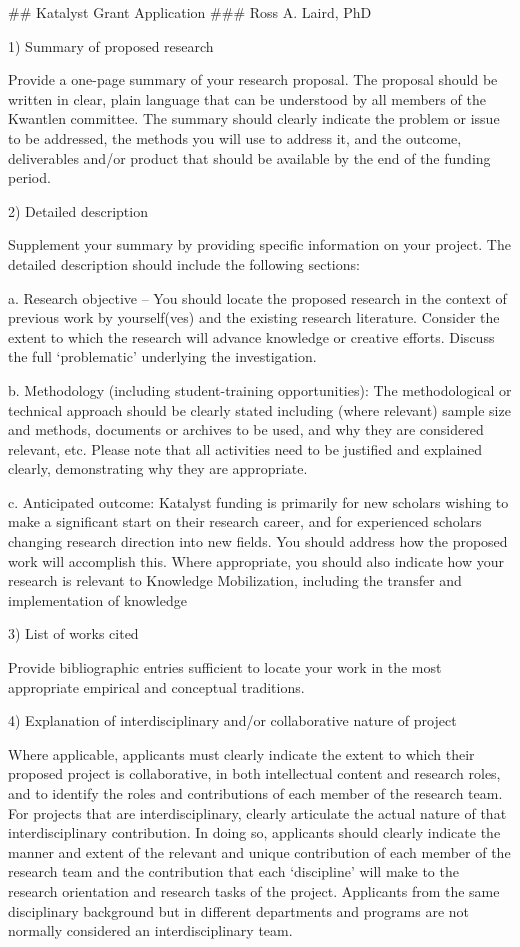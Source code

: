 
## Katalyst Grant Application
### Ross A. Laird, PhD


1) Summary of proposed research

Provide a one-page summary of your research proposal. The proposal should be written in clear,
plain language that can be understood by all members of the Kwantlen committee. The summary
should clearly indicate the problem or issue to be addressed, the methods you will use to address it,
and the outcome, deliverables and/or product that should be available by the end of the funding
period.

2) Detailed description

Supplement your summary by providing specific information on your project. The detailed
description should include the following sections:

a. Research objective – You should locate the proposed research in the context of previous work
by yourself(ves) and the existing research literature. Consider the extent to which the research
will advance knowledge or creative efforts. Discuss the full ‘problematic’ underlying the
investigation.

b. Methodology (including student-training opportunities): The methodological or technical
approach should be clearly stated including (where relevant) sample size and methods,
documents or archives to be used, and why they are considered relevant, etc. Please note that
all activities need to be justified and explained clearly, demonstrating why they are appropriate.

c. Anticipated outcome: Katalyst funding is primarily for new scholars wishing to make a
significant start on their research career, and for experienced scholars changing research
direction into new fields. You should address how the proposed work will accomplish this.
Where appropriate, you should also indicate how your research is relevant to Knowledge
Mobilization, including the transfer and implementation of knowledge

3) List of works cited

Provide bibliographic entries sufficient to locate your work in the most appropriate empirical and
conceptual traditions.

4) Explanation of interdisciplinary and/or collaborative nature of project

Where applicable, applicants must clearly indicate the extent to which their proposed project is
collaborative, in both intellectual content and research roles, and to identify the roles and
contributions of each member of the research team. For projects that are interdisciplinary,
clearly articulate the actual nature of that interdisciplinary contribution. In doing so, applicants
should clearly indicate the manner and extent of the relevant and unique contribution of each
member of the research team and the contribution that each ‘discipline’ will make to the
research orientation and research tasks of the project. Applicants from the same disciplinary
background but in different departments and programs are not normally considered an
interdisciplinary team.

